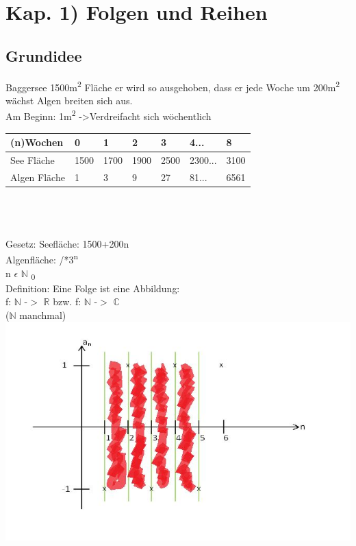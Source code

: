 \documentclass[../mainfile.tex]{subfile}
\author{Barbara Wiedermann}
\begin{document}
	\section{Kap. 1) Folgen und Reihen}
	\subsection{Grundidee}
	 	Baggersee 1500m\textsuperscript{2} Fläche er wird so ausgehoben, dass er jede Woche um 200m\textsuperscript{2} wächst Algen breiten sich aus.\\
	 	Am Beginn: 1m\textsuperscript{2} -\textgreater Verdreifacht sich wöchentlich\\
	 	
\begin{tabular}{|l|l|l|l|l|l|l|}
\hline
(n)Wochen    & 0    & 1    & 2    & 3    & 4...    & 8    \\ \hline
See Fläche   & 1500 & 1700 & 1900 & 2500 & 2300... & 3100 \\ \hline
Algen Fläche & 1    & 3    & 9    & 27   & 81...   & 6561 \\ \hline
\end{tabular}\\\\\\
Gesetz: Seefläche: 1500+200n\\
Algenfläche: /*3\textsuperscript{n}\\
n $\epsilon$ $\mathbb{N}$ \textsubscript{0} \\

Definition: Eine Folge ist eine Abbildung: \\
f: $\mathbb{N}$ -$>$ $\mathbb{R}$ bzw. f: $\mathbb{N}$ -$>$ $\mathbb{C}$\\
($\mathbb{N}$ manchmal)\\

\includegraphics[width = \textwidth]{./bwiedermann/img/Zeichnung.jpg}
\end{document}
